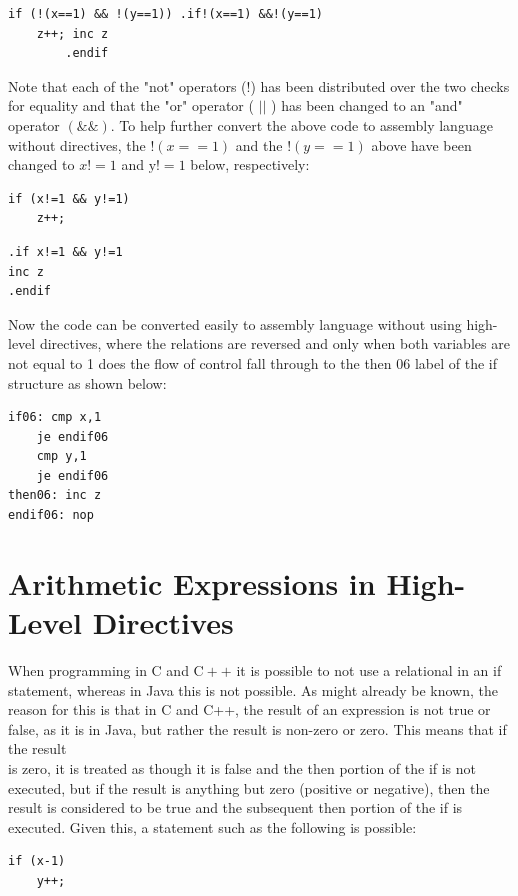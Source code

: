 \documentclass[10pt]{book}
\begin{document}
\begin{verbatim}
if (!(x==1) && !(y==1)) .if!(x==1) &&!(y==1)
    z++; inc z
        .endif
\end{verbatim}

Note that each of the "not" operators (!) has been distributed over the two checks for equality and that the "or" operator ( $|\mid$ ) has been changed to an "and" operator $(\& \&)$. To help further convert the above code to assembly language without directives, the $!(x==1)$ and the $!(y==1)$ above have been changed to $x!=1$ and $\mathrm{y}!=1$ below, respectively:

\begin{verbatim}
if (x!=1 && y!=1)
    z++;
\end{verbatim}

\begin{verbatim}
.if x!=1 && y!=1
inc z
.endif
\end{verbatim}

Now the code can be converted easily to assembly language without using high-level directives, where the relations are reversed and only when both variables are not equal to 1 does the flow of control fall through to the then 06 label of the if structure as shown below:

\begin{verbatim}
if06: cmp x,1
    je endif06
    cmp y,1
    je endif06
then06: inc z
endif06: nop
\end{verbatim}

\section{Arithmetic Expressions in High-Level Directives}
When programming in C and $\mathrm{C}++$ it is possible to not use a relational in an if statement, whereas in Java this is not possible. As might already be known, the reason for this is that in C and C++, the result of an expression is not true or false, as it is in Java, but rather the result is non-zero or zero. This means that if the result\\
is zero, it is treated as though it is false and the then portion of the if is not executed, but if the result is anything but zero (positive or negative), then the result is considered to be true and the subsequent then portion of the if is executed. Given this, a statement such as the following is possible:


\begin{verbatim}
if (x-1)
    y++;
\end{verbatim}
\end{document}
